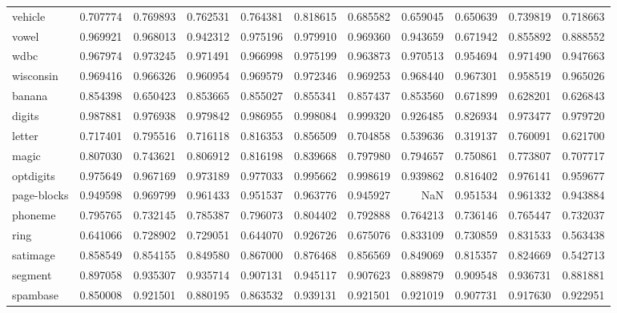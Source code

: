 \begin{tabular}{lrrrrrrrrrr}
vehicle         &   0.707774 &  0.769893 &  0.762531 &  0.764381 &  0.818615 &  0.685582 &  0.659045 &  0.650639 &  0.739819 &  0.718663 \\
vowel           &   0.969921 &  0.968013 &  0.942312 &  0.975196 &  0.979910 &  0.969360 &  0.943659 &  0.671942 &  0.855892 &  0.888552 \\
wdbc            &   0.967974 &  0.973245 &  0.971491 &  0.966998 &  0.975199 &  0.963873 &  0.970513 &  0.954694 &  0.971490 &  0.947663 \\
wisconsin       &   0.969416 &  0.966326 &  0.960954 &  0.969579 &  0.972346 &  0.969253 &  0.968440 &  0.967301 &  0.958519 &  0.965026 \\
banana          &   0.854398 &  0.650423 &  0.853665 &  0.855027 &  0.855341 &  0.857437 &  0.853560 &  0.671899 &  0.628201 &  0.626843 \\
digits          &   0.987881 &  0.976938 &  0.979842 &  0.986955 &  0.998084 &  0.999320 &  0.926485 &  0.826934 &  0.973477 &  0.979720 \\
letter          &   0.717401 &  0.795516 &  0.716118 &  0.816353 &  0.856509 &  0.704858 &  0.539636 &  0.319137 &  0.760091 &  0.621700 \\
magic           &   0.807030 &  0.743621 &  0.806912 &  0.816198 &  0.839668 &  0.797980 &  0.794657 &  0.750861 &  0.773807 &  0.707717 \\
optdigits       &   0.975649 &  0.967169 &  0.973189 &  0.977033 &  0.995662 &  0.998619 &  0.939862 &  0.816402 &  0.976141 &  0.959677 \\
page-blocks     &   0.949598 &  0.969799 &  0.961433 &  0.951537 &  0.963776 &  0.945927 &       NaN &  0.951534 &  0.961332 &  0.943884 \\
phoneme         &   0.795765 &  0.732145 &  0.785387 &  0.796073 &  0.804402 &  0.792888 &  0.764213 &  0.736146 &  0.765447 &  0.732037 \\
ring            &   0.641066 &  0.728902 &  0.729051 &  0.644070 &  0.926726 &  0.675076 &  0.833109 &  0.730859 &  0.831533 &  0.563438 \\
satimage        &   0.858549 &  0.854155 &  0.849580 &  0.867000 &  0.876468 &  0.856569 &  0.849069 &  0.815357 &  0.824669 &  0.542713 \\
segment         &   0.897058 &  0.935307 &  0.935714 &  0.907131 &  0.945117 &  0.907623 &  0.889879 &  0.909548 &  0.936731 &  0.881881 \\
spambase        &   0.850008 &  0.921501 &  0.880195 &  0.863532 &  0.939131 &  0.921501 &  0.921019 &  0.907731 &  0.917630 &  0.922951 \\

\end{tabular}
